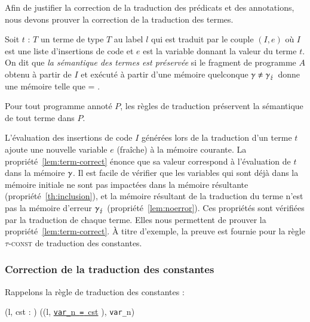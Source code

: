 Afin de justifier la correction de la traduction des prédicats et des
annotations, nous devons prouver la correction de la traduction des termes.

\begin{definition}
  \label{def:term-correct}
  Soit $t$ : $T$ un terme de type $T$ au label $l$ qui est traduit par le couple
  $(I, e)$ où $I$ est une liste d'insertions de code et $e$ est la variable
  donnant la valeur du terme $t$.
  On dit que \emph{la sémantique des termes est préservée} si le fragment de
  programme $A$ obtenu à partir de $I$ et exécuté à partir d'une mémoire
  quelconque $\gamma \neq \gamma_\lightning$ donne une mémoire  telle
  que  = .
\end{definition}

\begin{myproperty}
  \label{lem:term-correct}
  Pour tout programme annoté $P$, les règles de traduction préservent la
  sémantique de tout terme \eacsl dans $P$.
\end{myproperty}

L'évaluation des insertions de code $I$ générées lors de la traduction d'un
terme $t$ ajoute une nouvelle variable $e$ (fraîche) à la mémoire courante.
La propriété~\ref{lem:term-correct} énonce que sa valeur correspond à
l'évaluation de $t$ dans la mémoire $\gamma$.
Il est facile de vérifier que les variables qui sont déjà dans la mémoire
initiale ne sont pas impactées dans la mémoire résultante
(propriété~\ref{th:inclusion}), et la mémoire résultant de la traduction du
terme n'est pas la mémoire d'erreur $\gamma_\lightning$ (propriété~\ref{lem:noerror}).
Ces propriétés sont vérifiées par la traduction de chaque terme.
Elles nous permettent de prouver la propriété~\ref{lem:term-correct}.
À titre d'exemple, la preuve est fournie pour la règle \textsc{$\tau$-const} de
traduction des constantes.


\subsubsection*{Correction de la traduction des constantes}


Rappelons la règle de traduction des constantes :

{
  {}
  { (l, cst : ) \trule
    ((l, \Zinit\underline{\mbox{\lstinline'var_'}n~\mbox{\lstinline'='}~cst}
    \semicolon),
    \mbox{\lstinline'var_'}n) }{}
}

